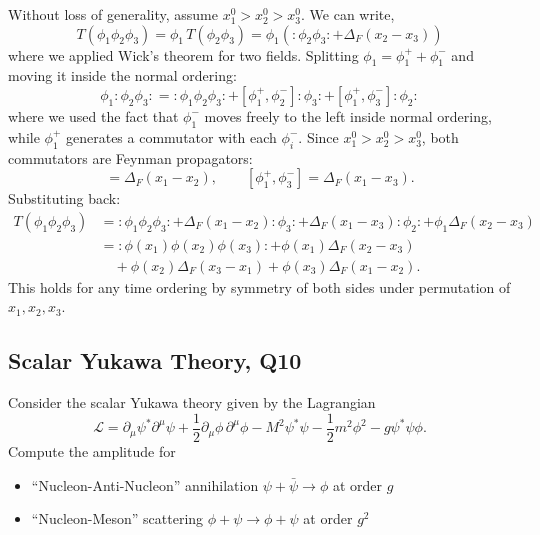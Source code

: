 \begin{solution}
    Without loss of generality, assume $x_1^0 > x_2^0 > x_3^0$. We can write, 
    \begin{equation}
        T(\phi_1\phi_2\phi_3) = \phi_1\, T(\phi_2\phi_3) = \phi_1\left(:\phi_2\phi_3: + \Delta_F(x_2-x_3)\right)
    \end{equation}
    where we applied Wick's theorem for two fields. Splitting $\phi_1 = \phi_1^+ + \phi_1^-$
    and moving it inside the normal ordering:
    \begin{equation}
        \phi_1:\phi_2\phi_3: = :\phi_1\phi_2\phi_3: + [\phi_1^+,\phi_2^-]:\phi_3: + [\phi_1^+,\phi_3^-]:\phi_2:
    \end{equation}
    where we used the fact that $\phi_1^-$ moves freely to the left inside normal ordering,
    while $\phi_1^+$ generates a commutator with each $\phi_i^-$. Since $x_1^0 > x_2^0 > x_3^0$,
    both commutators are Feynman propagators:
    \begin{equation}
        [\phi_1^+, \phi_2^-] = \Delta_F(x_1-x_2), \qquad [\phi_1^+,\phi_3^-] = \Delta_F(x_1-x_3).
    \end{equation}
    Substituting back:
    \begin{equation}
    \begin{aligned}
        T(\phi_1\phi_2\phi_3) &= :\phi_1\phi_2\phi_3: + \Delta_F(x_1-x_2):\phi_3: + \Delta_F(x_1-x_3):\phi_2: + \phi_1\Delta_F(x_2-x_3)\\
        &= :\phi(x_1)\phi(x_2)\phi(x_3): + \phi(x_1)\Delta_F(x_2-x_3)\\
        &\quad + \phi(x_2)\Delta_F(x_3-x_1) + \phi(x_3)\Delta_F(x_1-x_2).
    \end{aligned}
    \end{equation}
    This holds for any time ordering by symmetry of both sides under permutation
    of $x_1, x_2, x_3$.
\end{solution}

\subsection{Scalar Yukawa Theory, Q10}

Consider the scalar Yukawa theory given by the Lagrangian
\begin{equation}
    \mathcal{L} = \partial_\mu\psi^*\partial^\mu\psi + \frac{1}{2}\partial_\mu\phi\,\partial^\mu\phi - M^2\psi^*\psi - \frac{1}{2}m^2\phi^2 - g\psi^*\psi\phi.
\end{equation}
Compute the amplitude for
\begin{itemize}
    \item ``Nucleon-Anti-Nucleon'' annihilation $\psi + \bar{\psi} \to \phi$ at order $g$
    \item ``Nucleon-Meson'' scattering $\phi + \psi \to \phi + \psi$ at order $g^2$
\end{itemize}

